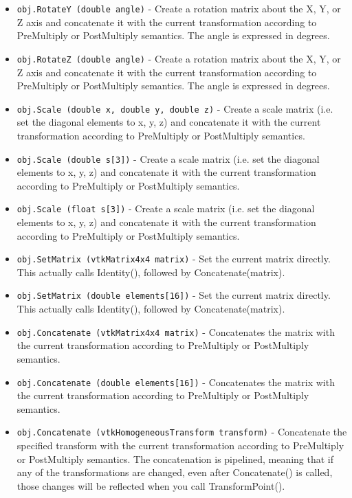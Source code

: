 \begin{itemize}
\item  \verb|obj.RotateY (double angle)| -  Create a rotation matrix about the X, Y, or Z axis and concatenate
 it with the current transformation according to PreMultiply or
 PostMultiply semantics.  The angle is expressed in degrees.

\item  \verb|obj.RotateZ (double angle)| -  Create a rotation matrix about the X, Y, or Z axis and concatenate
 it with the current transformation according to PreMultiply or
 PostMultiply semantics.  The angle is expressed in degrees.

\item  \verb|obj.Scale (double x, double y, double z)| -  Create a scale matrix (i.e. set the diagonal elements to x, y, z)
 and concatenate it with the current transformation according to
 PreMultiply or PostMultiply semantics.

\item  \verb|obj.Scale (double s[3])| -  Create a scale matrix (i.e. set the diagonal elements to x, y, z)
 and concatenate it with the current transformation according to
 PreMultiply or PostMultiply semantics.

\item  \verb|obj.Scale (float s[3])| -  Create a scale matrix (i.e. set the diagonal elements to x, y, z)
 and concatenate it with the current transformation according to
 PreMultiply or PostMultiply semantics.

\item  \verb|obj.SetMatrix (vtkMatrix4x4 matrix)| -  Set the current matrix directly.  This actually calls Identity(),
 followed by Concatenate(matrix).

\item  \verb|obj.SetMatrix (double elements[16])| -  Set the current matrix directly.  This actually calls Identity(),
 followed by Concatenate(matrix).

\item  \verb|obj.Concatenate (vtkMatrix4x4 matrix)| -  Concatenates the matrix with the current transformation according
 to PreMultiply or PostMultiply semantics.

\item  \verb|obj.Concatenate (double elements[16])| -  Concatenates the matrix with the current transformation according
 to PreMultiply or PostMultiply semantics.

\item  \verb|obj.Concatenate (vtkHomogeneousTransform transform)| -  Concatenate the specified transform with the current transformation
 according to PreMultiply or PostMultiply semantics.
 The concatenation is pipelined, meaning that if any of the
 transformations are changed, even after Concatenate() is called,
 those changes will be reflected when you call TransformPoint().


\end{itemize}
